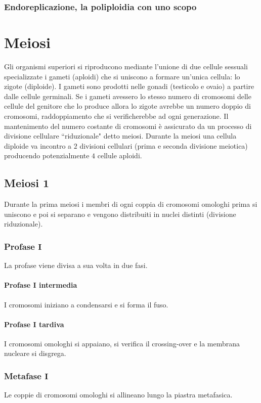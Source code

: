 \subsubsection{Endoreplicazione, la poliploidia con uno scopo}

\section{Meiosi}
Gli organismi superiori si riproducono mediante l'unione di due cellule sessuali specializzate i gameti (aploidi) che si uniscono a formare un'unica cellula: lo zigote (diploide). I 
gameti sono prodotti nelle gonadi (testicolo e ovaio) a partire dalle cellule germinali. Se i gameti avessero lo stesso numero di cromosomi delle cellule del genitore che lo produce 
allora lo zigote avrebbe un numero doppio di cromosomi, raddoppiamento che si verificherebbe ad ogni generazione. Il mantenimento del numero costante di cromosomi \`e assicurato da
un processo di divisione cellulare ``riduzionale" detto meiosi. Durante la meiosi una cellula diploide va incontro a $2$ divisioni cellulari (prima e seconda divisione meiotica) 
producendo potenzialmente $4$ cellule aploidi.
\subsection{Meiosi $\mathbf{1}$}
Durante la prima meiosi i membri di ogni coppia di cromosomi omologhi prima si uniscono e poi si separano e vengono distribuiti in nuclei distinti (divisione riduzionale). 
\subsubsection{Profase $\mathbf{I}$}
La profase viene divisa a sua volta in due fasi.
\paragraph{Profase $\mathbf{I}$ intermedia}
I cromosomi iniziano a condensarsi e si forma il fuso. 
\paragraph{Profase $\mathbf{I}$ tardiva}
I cromosomi omologhi si appaiano, si verifica il crossing-over e la membrana nucleare si disgrega.
\subsubsection{Metafase $\mathbf{I}$}
Le coppie di cromosomi omologhi si allineano lungo la piastra metafasica.

